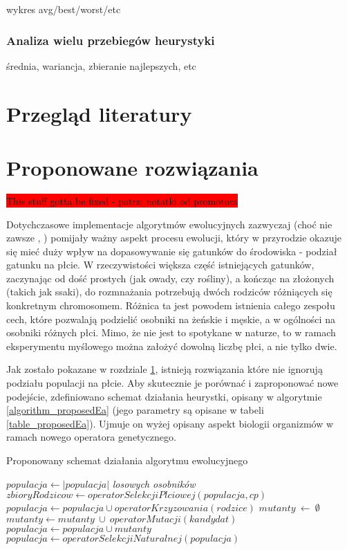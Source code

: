 \documentclass[twoside]{iisthesis}
\newcommand{\todo}{\colorbox{red}}
\begin{document}
wykres avg/best/worst/etc
\subsection{Analiza wielu przebiegów heurystyki}
średnia, wariancja, zbieranie najlepszych, etc



\chapter{Przegląd literatury} \label{chapter_literature}
\chapter{Proponowane rozwiązania} \label{chapter_proposed}
\todo{This stuff gotta be fixed - patrz: notatki od promotora}

Dotychczasowe implementacje algorytmów ewolucyjnych zazwyczaj (choć nie zawsze \cite{GGA}, \cite{SexualGA}) pomijały ważny aspekt procesu ewolucji, który w przyrodzie okazuje się mieć duży wpływ na dopasowywanie się gatunków do środowiska - podział gatunku na płcie. W rzeczywistości większa część istniejących gatunków, zaczynając od dość prostych (jak owady, czy rośliny), a kończąc na złożonych (takich jak ssaki), do rozmnażania potrzebują dwóch rodziców różniących się konkretnym chromosomem. Różnica ta jest powodem istnienia całego zespołu cech, które pozwalają podzielić osobniki na żeńskie i męskie, a w ogólności na osobniki różnych płci. Mimo, że nie jest to spotykane w naturze, to w ramach eksperymentu myślowego można założyć dowolną liczbę płci, a nie tylko dwie.

Jak zostało pokazane w rozdziale \ref{chapter_literature}, istnieją rozwiązania które nie ignorują podziału populacji na płcie. Aby skutecznie je porównać i zaproponować nowe podejście, zdefiniowano schemat działania heurystki, opisany w algorytmie \ref{algorithm_proposedEa} (jego parametry są opisane w tabeli \ref{table_proposedEa}). Ujmuje on wyżej opisany aspekt biologii organizmów w ramach nowego operatora genetycznego.

\begin{algorithm}
	\caption{Proponowany schemat działania algorytmu ewolucyjnego}
	\label{algorithm_proposedEa}
	\begin{algorithmic}[1]
		\Var $populacja \gets |populacja|$ \textit{losowych osobników}
		\Var $zbioryRodzicow \gets operatorSelekcjiPlciowej(populacja, cp)$
		\State $populacja \gets populacja \cup operatorKrzyzowania(rodzice)$
		\EndFor
		\Var $mutanty\ \gets\ \emptyset$
		\State $mutanty \gets mutanty\ \cup\ operatorMutacji(kandydat)$
		\EndIf
		\EndFor
		\State $populacja \gets populacja \cup mutanty$    
		\State $populacja \gets operatorSelekcjiNaturalnej(populacja)$
		\EndWhile  
		\EndProcedure
	\end{algorithmic}
\end{algorithm}
\end{document}
